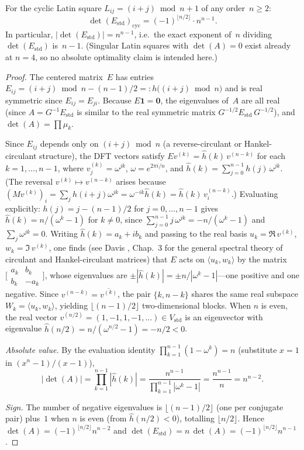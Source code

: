 \documentclass[11pt,a4paper]{article}
\newcommand{\one}{\mathbf{1}}
\newcommand{\Estd}{E_{\mathrm{std}}}
\newcommand{\Vstd}{V_{\mathrm{std}}}
\begin{document}
\begin{proposition}\label{prop:cyclic}
For the cyclic Latin square $L_{ij}=(i+j)\bmod n + 1$ of any
order~$n\ge 2$:
\[
  \det(\Estd)_{\mathrm{cyc}} = (-1)^{\lfloor n/2\rfloor}\cdot n^{n-1}.
\]
In particular, $|\det(\Estd)|=n^{n-1}$, i.e.\ the exact exponent of~$n$
dividing $\det(\Estd)$ is~$n{-}1$.
(Singular Latin squares with $\det(A)=0$ exist already at $n=4$,
so no absolute optimality claim is intended here.)
\end{proposition}

\begin{proof}
The centered matrix~$E$ has entries
$E_{ij}=(i{+}j)\bmod n - (n{-}1)/2 =: h\bigl((i{+}j)\bmod n\bigr)$
and is real symmetric since $E_{ij}=E_{ji}$.  Because $E\one=\mathbf{0}$,
the eigenvalues of~$A$ are all real
(since $A=G^{-1}\Estd$ is similar to the real symmetric matrix
$G^{-1/2}\Estd\,G^{-1/2}$), and $\det(A)=\prod \mu_k$.

Since $E_{ij}$ depends only on $(i{+}j)\bmod n$ (a reverse-circulant
or Hankel-circulant structure), the DFT vectors satisfy
$Ev^{(k)}=\hat{h}(k)\,v^{(n-k)}$ for each $k=1,\dots,n-1$,
where $v^{(k)}_j=\omega^{jk}$, $\omega=e^{2\pi i/n}$, and
$\hat{h}(k)=\sum_{j=0}^{n-1}h(j)\,\omega^{jk}$.
(The reversal $v^{(k)}\mapsto v^{(n-k)}$ arises because
$(Mv^{(k)})_i = \sum_j h(i{+}j)\omega^{jk} =
\omega^{-ik}\hat{h}(k) = \hat{h}(k)\,v^{(n-k)}_i$.)
Evaluating explicitly: $h(j) = j - (n{-}1)/2$ for $j=0,\dots,n{-}1$
gives $\hat{h}(k) = n/(\omega^k{-}1)$ for $k\neq 0$, since
$\sum_{j=0}^{n-1}j\,\omega^{jk} = -n/(\omega^k{-}1)$
and $\sum_{j}\omega^{jk}=0$.
Writing $\hat{h}(k)=a_k+ib_k$ and passing to the real basis
$u_k=\Re\,v^{(k)}$, $w_k=\Im\,v^{(k)}$, one finds (see Davis
\cite{Davis94}, Chap.~3 for the general spectral theory of circulant
and Hankel-circulant matrices) that
$E$ acts on $\langle u_k,w_k\rangle$ by the matrix
$\bigl[\begin{smallmatrix}a_k&b_k\\b_k&-a_k\end{smallmatrix}\bigr]$,
whose eigenvalues are $\pm|\hat{h}(k)|=\pm n/|\omega^k{-}1|$---one
positive and one negative.
Since $v^{(n-k)}=\overline{v^{(k)}}$, the pair $\{k,n{-}k\}$
shares the same real subspace $W_k=\langle u_k,w_k\rangle$,
yielding $\lfloor(n{-}1)/2\rfloor$ two-dimensional blocks.
When $n$ is even, the real vector
$v^{(n/2)}=(1,-1,1,-1,\dots)\in\Vstd$ is an eigenvector with
eigenvalue $\hat{h}(n/2)=n/(\omega^{n/2}{-}1)=-n/2<0$.

\medskip\noindent\emph{Absolute value.}\;
By the evaluation identity
$\prod_{k=1}^{n-1}(1{-}\omega^k)=n$ (substitute $x=1$ in
$(x^n{-}1)/(x{-}1)$),
\[
  |\!\det(A)|
  =\prod_{k=1}^{n-1}|\hat h(k)|
  =\frac{n^{n-1}}{\prod_{k=1}^{n-1}|\omega^k{-}1|}
  =\frac{n^{n-1}}{n}=n^{n-2}.
\]

\medskip\noindent\emph{Sign.}\;
The number of negative eigenvalues is $\lfloor(n{-}1)/2\rfloor$ (one
per conjugate pair) plus~$1$ when $n$ is even (from $\hat h(n/2)<0$),
totalling $\lfloor n/2\rfloor$.
Hence $\det(A)=(-1)^{\lfloor n/2\rfloor}n^{n-2}$ and
$\det(\Estd)=n\,\det(A)=(-1)^{\lfloor n/2\rfloor}n^{n-1}$.
\end{proof}
\end{document}
